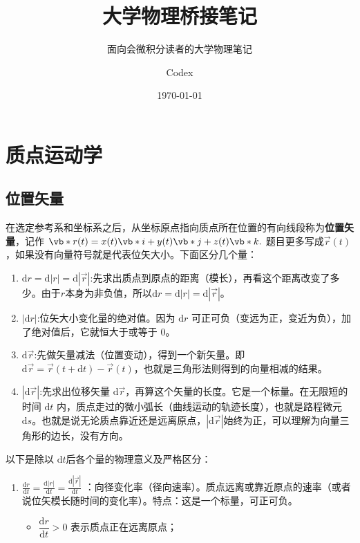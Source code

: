 \documentclass[lang=cn,11pt]{elegantbook}
\title{大学物理桥接笔记}
\subtitle{面向会微积分读者的大学物理笔记}
\author{Codex}
\institute{ElegantBook 重构实践}
\date{\today}
\begin{document}
\maketitle
\frontmatter
{}

\tableofcontents
\makeenvindex
\mainmatter

\chapter{质点运动学}

\section{位置矢量}

\begin{definition}[位置矢量]\label{def:position-vector}
在选定参考系和坐标系之后，从坐标原点指向质点所在位置的有向线段称为\textbf{位置矢量}，记作
 \(\vb*{r}(t)=x(t)\vb*{i}+y(t)\vb*{j}+z(t)\vb*{k}.\) 题目更多写成$\vec{r}(t)$，如果没有向量符号就是代表位矢大小。下面区分几个量：
\begin{enumerate}
\item $\mathrm{d}r=\mathrm{d}|r|=\mathrm{d}|\vec{r}|$:先求出质点到原点的距离（模长），再看这个距离改变了多少。由于$r$本身为非负值，所以$\mathrm{d}r=\mathrm{d}|r|=\mathrm{d}|\vec{r}|$。
\item $|\mathrm{d}r|$:位矢大小变化量的绝对值。因为 $\mathrm{d}r$ 可正可负（变远为正，变近为负），加了绝对值后，它就恒大于或等于 0。
\item $\mathrm{d}\vec{r}$:先做矢量减法（位置变动），得到一个新矢量。即 $\mathrm{d}\vec{r} = \vec{r}(t+\mathrm{d}t) - \vec{r}(t)$，也就是三角形法则得到的向量相减的结果。
\item $|\mathrm{d}\vec{r}|$:先求出位移矢量 $\mathrm{d}\vec{r}$，再算这个矢量的长度。它是一个标量。在无限短的时间 $\mathrm{d}t$ 内，质点走过的微小弧长（曲线运动的轨迹长度），也就是路程微元 $\mathrm{d}s$。也就是说无论质点靠近还是远离原点，$|\mathrm{d}\vec{r}|$始终为正，可以理解为向量三角形的边长，没有方向。
\end{enumerate}
以下是除以 $\mathrm{d}t$后各个量的物理意义及严格区分：
\begin{enumerate}
\item $\frac{\mathrm{d}r}{\mathrm{d}t} = \frac{\mathrm{d}|r|}{\mathrm{d}t} = \frac{\mathrm{d}|\vec{r}|}{\mathrm{d}t}$ ：向径变化率（径向速率）。质点远离或靠近原点的速率（或者说位矢模长随时间的变化率）。特点：这是一个标量，可正可负。
\begin{itemize}
\item $\dfrac{\mathrm{d}r}{\mathrm{d}t} > 0$ 表示质点正在远离原点；

\end{itemize}
\end{enumerate}
\end{definition}
\end{document}
